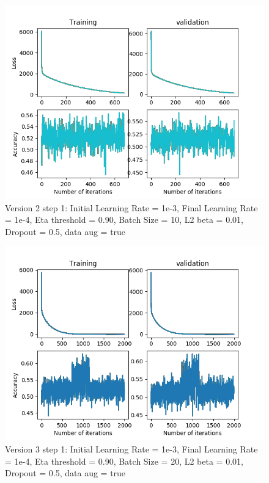 \documentclass[12pt,reqno]{amsart}
\numberwithin{equation}{section}
\begin{document}
\begin{enumerate}
\begin{figure}[H]
\centering
\includegraphics[scale=0.6]{data_liquid155_version2_step1}
\caption{Version 2 step 1: Initial Learning Rate = 1e-3, Final Learning Rate = 1e-4, Eta threshold = 0.90, Batch Size = 10, L2 beta = 0.01, Dropout = 0.5, data aug = true}
\end{figure}

\begin{figure}[H]
\centering
\includegraphics[scale=0.6]{data_liquid155_version3_step1}
\caption{Version 3 step 1: Initial Learning Rate = 1e-3, Final Learning Rate = 1e-4, Eta threshold = 0.90, Batch Size = 20, L2 beta = 0.01, Dropout = 0.5, data aug = true}
\end{figure}


\end{enumerate}
\end{document}

